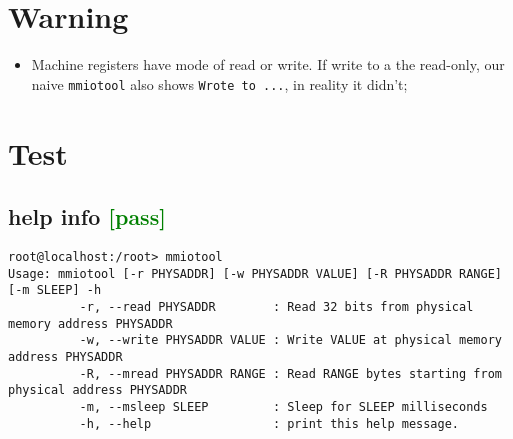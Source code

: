 \documentclass[a4paper]{report}
\begin{document}
\section{Warning}
\begin{itemize}
    \item Machine registers have mode of read or write. If write to a the read-only, 
          our naive {\tt mmiotool} also shows {\tt Wrote to ...}, in reality it didn't;
\end{itemize}
\section{Test}
\subsection{help info \textcolor{green}{[pass]}}
\begin{lstlisting}
root@localhost:/root> mmiotool 
Usage: mmiotool [-r PHYSADDR] [-w PHYSADDR VALUE] [-R PHYSADDR RANGE] [-m SLEEP] -h
          -r, --read PHYSADDR        : Read 32 bits from physical memory address PHYSADDR 
          -w, --write PHYSADDR VALUE : Write VALUE at physical memory address PHYSADDR 
          -R, --mread PHYSADDR RANGE : Read RANGE bytes starting from physical address PHYSADDR 
          -m, --msleep SLEEP         : Sleep for SLEEP milliseconds 
          -h, --help                 : print this help message.
\end{lstlisting}
\end{document}
